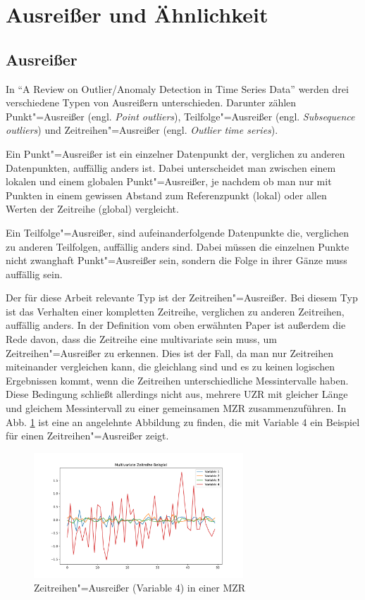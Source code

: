 \section{Ausreißer und Ähnlichkeit}
\subsection{Ausreißer}
In "`A Review on Outlier/Anomaly Detection in Time Series Data"' \cite[Ch. 2.2]{aauj2021} werden drei verschiedene Typen von Ausreißern unterschieden. Darunter zählen Punkt"=Ausreißer (engl. \textit{Point outliers}), Teilfolge"=Ausreißer (engl. \textit{Subsequence outliers}) und Zeitreihen"=Ausreißer (engl. \textit{Outlier time series}).

Ein Punkt"=Ausreißer ist ein einzelner Datenpunkt der, verglichen zu anderen Datenpunkten, auffällig anders ist. Dabei unterscheidet man zwischen einem lokalen und einem globalen Punkt"=Ausreißer, je nachdem ob man nur mit Punkten in einem gewissen Abstand zum Referenzpunkt (lokal) oder allen Werten der Zeitreihe (global) vergleicht.

Ein Teilfolge"=Ausreißer, sind aufeinanderfolgende Datenpunkte die, verglichen zu anderen Teilfolgen, auffällig anders sind. Dabei müssen die einzelnen Punkte nicht zwanghaft Punkt"=Ausreißer sein, sondern die Folge in ihrer Gänze muss auffällig sein. 

Der für diese Arbeit relevante Typ ist der Zeitreihen"=Ausreißer. Bei diesem Typ ist das Verhalten einer kompletten Zeitreihe, verglichen zu anderen Zeitreihen, auffällig anders. In der Definition vom oben erwähnten Paper \cite{aauj2021} ist außerdem die Rede davon, dass die Zeitreihe eine multivariate sein muss, um Zeitreihen"=Ausreißer zu erkennen. Dies ist der Fall, da man nur Zeitreihen miteinander vergleichen kann, die gleichlang sind und es zu keinen logischen Ergebnissen kommt, wenn die Zeitreihen unterschiedliche Messintervalle haben. Diese Bedingung schließt allerdings nicht aus, mehrere \acs{UZR} mit gleicher Länge und gleichem Messintervall zu einer gemeinsamen \acs{MZR} zusammenzuführen. In Abb. \ref{fig:ZeitreihenAusreisserBeispiel} ist eine an \cite[Fig. 5]{aauj2021} angelehnte Abbildung zu finden, die mit Variable 4 ein Beispiel für einen Zeitreihen"=Ausreißer zeigt.
\begin{figure}[bth] 
  \centering
  \includegraphics[width=0.7\textwidth]{Graphics/TimeSeriesOutlierExample.pdf}
  \caption{Zeitreihen"=Ausreißer (Variable 4) in einer \acs{MZR}}
  \label{fig:ZeitreihenAusreisserBeispiel}
\end{figure}

